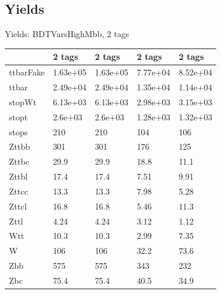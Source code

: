 
\subsection{Yields}

\begin{frame}{Yields: BDTVarsHighMbb, 2 tags}
\begin{center}
  \begin{tabular}{l| >{\centering\let\newline\\\arraybackslash\hspace{0pt}}m{1.4cm}| >{\centering\let\newline\\\arraybackslash\hspace{0pt}}m{1.4cm}| >{\centering\let\newline\\\arraybackslash\hspace{0pt}}m{1.4cm}| >{\centering\let\newline\\\arraybackslash\hspace{0pt}}m{1.4cm}}
    & 2 tags & 2 tags & 2 tags & 2 tags \\
 \hline \hline
    ttbarFake& 1.63e+05 & 1.63e+05 & 7.77e+04 & 8.52e+04 \\
 \hline
    ttbar& 2.49e+04 & 2.49e+04 & 1.35e+04 & 1.14e+04 \\
 \hline
    stopWt& 6.13e+03 & 6.13e+03 & 2.98e+03 & 3.15e+03 \\
 \hline
    stopt& 2.6e+03 & 2.6e+03 & 1.28e+03 & 1.32e+03 \\
 \hline
    stops& 210 & 210 & 104 & 106 \\
 \hline
    Zttbb& 301 & 301 & 176 & 125 \\
 \hline
    Zttbc& 29.9 & 29.9 & 18.8 & 11.1 \\
 \hline
    Zttbl& 17.4 & 17.4 & 7.51 & 9.91 \\
 \hline
    Zttcc& 13.3 & 13.3 & 7.98 & 5.28 \\
 \hline
    Zttcl& 16.8 & 16.8 & 5.46 & 11.3 \\
 \hline
    Zttl& 4.24 & 4.24 & 3.12 & 1.12 \\
 \hline
    Wtt& 10.3 & 10.3 & 2.99 & 7.35 \\
 \hline
    W& 106 & 106 & 32.2 & 73.6 \\
 \hline
    Zbb& 575 & 575 & 343 & 232 \\
 \hline
    Zbc& 75.4 & 75.4 & 40.5 & 34.9 \\

\end{tabular}
\end{center}
\end{frame}
